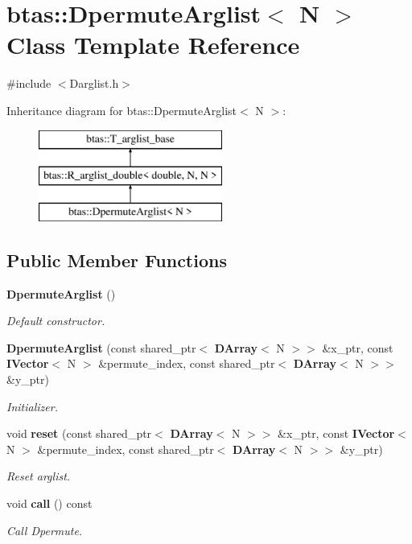 \section{btas\-:\-:Dpermute\-Arglist$<$ N $>$ Class Template Reference}
\label{d6/d58/classbtas_1_1DpermuteArglist}


{\ttfamily \#include $<$Darglist.\-h$>$}

Inheritance diagram for btas\-:\-:Dpermute\-Arglist$<$ N $>$\-:\begin{figure}[H]
\begin{center}
\leavevmode
\includegraphics[height=3.000000cm]{d6/d58/classbtas_1_1DpermuteArglist}
\end{center}
\end{figure}
\subsection*{Public Member Functions}
\begin{DoxyCompactItemize}
\item 
{\bf Dpermute\-Arglist} ()
\begin{DoxyCompactList}\small\item\em Default constructor. \end{DoxyCompactList}\item 
{\bf Dpermute\-Arglist} (const shared\-\_\-ptr$<$ {\bf D\-Array}$<$ N $>$$>$ \&x\-\_\-ptr, const {\bf I\-Vector}$<$ N $>$ \&permute\-\_\-index, const shared\-\_\-ptr$<$ {\bf D\-Array}$<$ N $>$$>$ \&y\-\_\-ptr)
\begin{DoxyCompactList}\small\item\em Initializer. \end{DoxyCompactList}\item 
void {\bf reset} (const shared\-\_\-ptr$<$ {\bf D\-Array}$<$ N $>$$>$ \&x\-\_\-ptr, const {\bf I\-Vector}$<$ N $>$ \&permute\-\_\-index, const shared\-\_\-ptr$<$ {\bf D\-Array}$<$ N $>$$>$ \&y\-\_\-ptr)
\begin{DoxyCompactList}\small\item\em Reset arglist. \end{DoxyCompactList}\item 
void {\bf call} () const 
\begin{DoxyCompactList}\small\item\em Call Dpermute. \end{DoxyCompactList}\end{DoxyCompactItemize}
